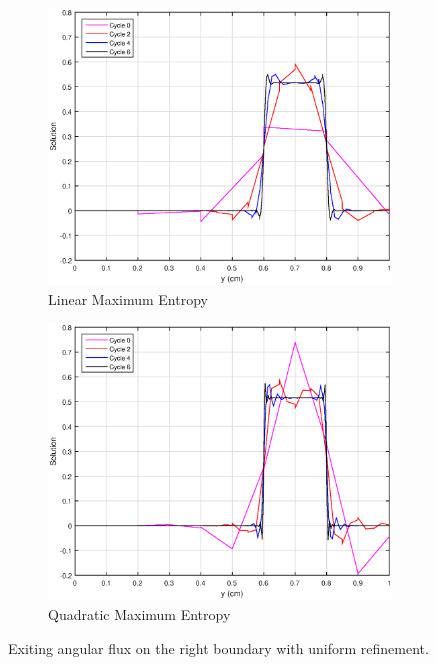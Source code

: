 \begin{figure}
{}
\vspace{2.5mm}
{
	\begin{subfigure}[b]{0.45\textwidth}
		\centering
		\label{subfig::SL_uniform_ef_me1}
		\includegraphics[width=\textwidth]{figures/sec_BF/SL_ME_k1_uniform.eps}
		\caption{Linear Maximum Entropy}
	\end{subfigure}
	\hfill
	\begin{subfigure}[b]{0.45\textwidth}
		\centering
		\label{subfig::SL_uniform_ef_me2}
		\includegraphics[width=\textwidth]{figures/sec_BF/SL_ME_k2_uniform.eps}
		\caption{Quadratic Maximum Entropy}
	\end{subfigure}
}
\caption{Exiting angular flux on the right boundary with uniform refinement.}
\label{fig::BF_Results_SL_uniform_exit_flux}
\end{figure}


